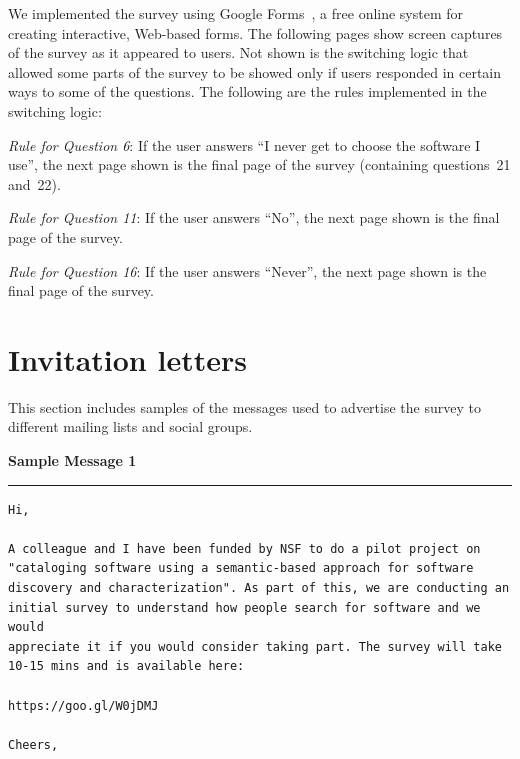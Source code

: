 \documentclass{casicswhitepaper}
\begin{document}
We implemented the survey using Google Forms~\cite{googleforms}, a free online system for creating interactive, Web-based forms.  The following pages show screen captures of the survey as it appeared to users.  Not shown is the switching logic that allowed some parts of the survey to be showed only if users responded in certain ways to some of the questions.  The following are the rules implemented in the switching logic:
\begin{description}

\item \emph{Rule for Question 6}: If the user answers ``I never get to choose the software I use'', the next page shown is the final page of the survey (containing questions~21 and~22).

\item  \emph{Rule for Question 11}: If the user answers ``No'', the next page shown is the final page of the survey.

\item \emph{Rule for Question 16}:  If the user answers ``Never'', the next page shown is the final page of the survey.

\end{description}


\clearpage



\section{Invitation letters}
\label{apdx:invitations}

This section includes samples of the messages used to advertise the survey to different mailing lists and social groups.


\vspace*{2em}
\textbf{Sample Message 1}
\hrule

\small
\begin{verbatim}
Hi,

A colleague and I have been funded by NSF to do a pilot project on
"cataloging software using a semantic-based approach for software
discovery and characterization". As part of this, we are conducting an
initial survey to understand how people search for software and we would
appreciate it if you would consider taking part. The survey will take
10-15 mins and is available here:

https://goo.gl/W0jDMJ

Cheers,
\end{verbatim}
\normalsize
\end{document}
